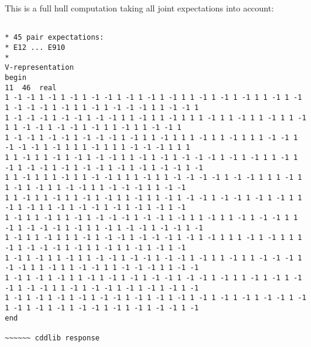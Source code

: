 \documentclass[%
  twocolumn,
 showpacs,
 showkeys,
 preprintnumbers,
 amsmath,amssymb,
 aps,
  pra,
  longbibliography,
 floatfix,
 ]{revtex4-1}
\begin{document}
This is a full hull computation taking all joint expectations into account:


{\footnotesize \begin{lstlisting}[backgroundcolor=\color{yellow!10},framerule=0pt,breaklines=true, frame=tb]

* 45 pair expectations:
* E12 ... E910
*
V-representation
begin
11  46  real
1 -1 -1 1 -1 1 -1 1 -1 -1 1 -1 1 -1 1 -1 1 1 -1 1 -1 1 -1 1 1 -1 1 -1 1 -1 -1 -1 1 -1 1 1 -1 1 -1 -1 -1 1 1 -1 -1 1
1 -1 -1 -1 1 -1 -1 1 -1 -1 1 1 -1 1 1 -1 1 1 1 -1 1 1 -1 1 1 -1 1 1 -1 1 1 -1 -1 1 -1 -1 1 -1 1 1 -1 1 1 -1 -1 1
1 -1 -1 1 -1 -1 1 -1 -1 -1 1 -1 1 1 -1 1 1 1 -1 1 1 -1 1 1 1 -1 -1 1 -1 -1 -1 1 -1 1 1 1 -1 1 1 1 -1 -1 -1 1 1 1
1 1 -1 1 1 -1 1 -1 1 -1 -1 1 1 -1 1 -1 1 -1 -1 -1 1 -1 1 -1 1 1 -1 1 -1 1 -1 -1 1 -1 1 -1 -1 1 -1 1 -1 1 -1 -1 1 -1
1 1 -1 1 1 1 -1 1 1 -1 -1 1 1 1 -1 1 1 -1 -1 -1 -1 1 -1 -1 1 1 1 -1 1 1 -1 1 -1 1 1 -1 -1 1 1 -1 -1 -1 1 1 -1 -1
1 1 -1 1 1 -1 1 1 -1 1 -1 1 1 -1 1 1 -1 1 -1 -1 1 -1 -1 1 -1 1 -1 1 1 -1 1 -1 1 1 -1 1 -1 -1 1 -1 1 -1 1 -1 1 -1
1 -1 1 1 -1 1 1 -1 1 -1 -1 -1 1 -1 -1 1 -1 1 1 -1 1 1 -1 1 -1 -1 1 1 -1 1 -1 -1 -1 1 -1 1 1 -1 1 -1 -1 1 -1 -1 1 -1
1 -1 1 1 -1 1 1 1 -1 1 -1 -1 1 -1 -1 -1 1 -1 1 -1 1 1 1 -1 1 -1 1 1 1 -1 1 -1 -1 -1 1 -1 1 1 -1 1 1 -1 1 -1 1 -1
1 -1 1 -1 1 1 -1 1 1 -1 -1 1 -1 -1 1 -1 -1 1 -1 1 1 -1 1 1 -1 -1 -1 1 -1 -1 1 1 -1 1 1 -1 -1 1 1 -1 -1 -1 1 1 -1 -1
1 -1 1 -1 1 -1 1 1 -1 1 -1 1 -1 1 -1 -1 1 -1 -1 1 -1 1 1 -1 1 -1 1 -1 -1 1 -1 -1 1 1 -1 1 -1 -1 1 -1 1 -1 1 -1 1 -1
1 -1 1 -1 1 -1 1 -1 1 -1 -1 1 -1 1 -1 1 -1 1 -1 1 -1 1 -1 1 -1 -1 1 -1 1 -1 1 -1 1 -1 1 -1 -1 1 -1 1 -1 1 -1 -1 1 -1
end

~~~~~~ cddlib response


\end{lstlisting}}
\end{document}
